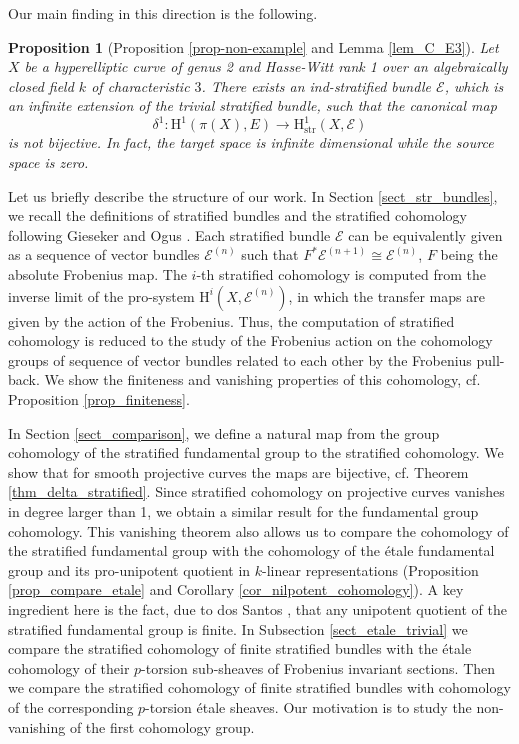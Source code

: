 \documentclass[12pt,a4]{amsart}
\newtheorem{proposition}[theorem]{Proposition}
\theoremstyle{definition}
\begin{document}
Our main finding in this direction is the following.
\begin{proposition}[Proposition \ref{prop-non-example} and Lemma \ref{lem_C_E3}]
Let $X$ be a hyperelliptic curve of genus 2 and Hasse-Witt rank 1 over an algebraically closed field $k$ of characteristic $3$. There exists an ind-stratified
bundle $\mathcal E$, which is an infinite extension of the trivial stratified bundle, such that
the canonical map
$$\delta^1: \mathrm{H}^1(\pi(X),E)\longrightarrow \mathrm{H}^1_{\mathrm{str}}(X,\mathcal E)$$
is not bijective. In fact, the target space is infinite dimensional while the source space is zero.\end{proposition}

 

Let us briefly describe the structure of our work. In Section \ref{sect_str_bundles},
we recall the definitions of stratified bundles and the stratified cohomology following
Gieseker \cite{Gie75} and Ogus \cite{Og75}. 
Each stratified bundle $\mathcal E$ can be equivalently given as a sequence of 
vector bundles $\mathcal E^{(n)}$ such that $F^*\mathcal E^{(n+1)}\cong \mathcal E^{(n)}$,
$F$ being the absolute Frobenius map.
The $i$-th stratified cohomology is computed from the inverse limit of the pro-system
$\mathrm{H}^i(X,\mathcal E^{(n)})$, in which the transfer maps are given by the
action of the Frobenius. %
Thus, the computation of stratified cohomology is reduced to the
study of the Frobenius action on the cohomology groups of sequence of vector bundles
related to each other by the Frobenius pull-back.
We show the finiteness and vanishing properties of this cohomology, cf. 
Proposition \ref{prop_finiteness}.  

In Section \ref{sect_comparison}, we define a natural map from the group cohomology of
the stratified fundamental group to the stratified cohomology.
We show that for smooth projective curves the maps are bijective, cf. Theorem \ref{thm_delta_stratified}. 
Since stratified cohomology on projective curves vanishes
in degree larger than 1, we obtain a similar result for the fundamental group cohomology.
This vanishing theorem also allows us to compare the cohomology of the stratified 
fundamental group with the cohomology of the \'etale fundamental group and its
pro-unipotent quotient in $k$-linear representations (Proposition \ref{prop_compare_etale} and 
Corollary \ref{cor_nilpotent_cohomology}). A key ingredient here is the fact, due to 
dos Santos \cite{dSa07}, that any unipotent quotient of the stratified 
fundamental group is finite. 
In Subsection \ref{sect_etale_trivial} we compare the stratified  
cohomology of finite stratified bundles with the \'etale cohomology of their
$p$-torsion sub-sheaves of Frobenius invariant sections. Then we compare
the stratified cohomology of finite stratified bundles with cohomology of the corresponding
$p$-torsion \'etale sheaves. Our motivation is to study the non-vanishing of the first
cohomology group. 
\end{document}
